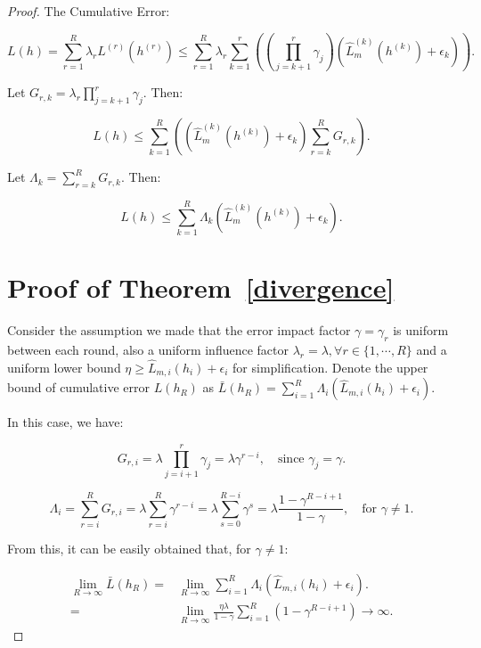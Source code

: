 \begin{proof}
The Cumulative Error:

\[
L(h) = \sum_{r=1}^R \lambda_r L^{(r)}(h^{(r)}) \leq \sum_{r=1}^R \lambda_r \sum_{k=1}^{r} \left( \left( \prod_{j=k+1}^{r} \gamma_j \right) \left( \hat{L}_m^{(k)}(h^{(k)}) + \epsilon_k \right) \right).
\]

Let \( G_{r,k} = \lambda_r \prod_{j=k+1}^{r} \gamma_j \). Then:

\[
L(h) \leq \sum_{k=1}^R \left( \left( \hat{L}_m^{(k)}(h^{(k)}) + \epsilon_k \right) \sum_{r=k}^R G_{r,k} \right).
\]

Let \( \Lambda_k = \sum_{r=k}^R G_{r,k} \). Then:

\[
L(h) \leq \sum_{k=1}^R \Lambda_k \left( \hat{L}_m^{(k)}(h^{(k)}) + \epsilon_k \right).
\]

\section{Proof of Theorem~\ref{divergence}}\label{appendix:divergence}

Consider the assumption we made that the error impact factor \(\gamma = \gamma_r\) is uniform between each round, also a uniform influence factor \(\lambda_r = \lambda, \forall r \in \{1,\cdots, R\}\) and a uniform lower bound \(\eta \geq  \hat{L}_{m,i}(h_{i}) + \epsilon_i \) for simplification. Denote the upper bound of cumulative error \(L(h_R)\) as \( \bar L(h_R) = \sum_{i=1}^R \Lambda_i \left( \hat{L}_{m,i}(h_{i}) + \epsilon_i \right)\).

In this case, we have:

\[
G_{r,i} = \lambda \prod_{j=i+1}^{r} \gamma_j = \lambda \gamma^{r - i}, \quad \text{since } \gamma_j = \gamma.
\]

\[
\Lambda_i = \sum_{r=i}^R G_{r,i} = \lambda \sum_{r=i}^R \gamma^{r - i} = \lambda \sum_{s=0}^{R - i} \gamma^{s} = \lambda \frac{1 - \gamma^{R - i + 1}}{1 - \gamma}, \quad \text{for } \gamma \neq 1.
\]

From this, it can be easily obtained that, for \(\gamma \neq 1\): 

\[
\begin{aligned}
    \lim_{R \to \infty} \bar L(h_R) =&\lim_{R \to \infty} \sum_{i=1}^R \Lambda_i \left( \hat{L}_{m,i}(h_{i}) + \epsilon_i \right).\\
    =&\lim_{R \to \infty} \frac{\eta \lambda}{1 - \gamma} \sum_{i=1}^R \left( 1 - \gamma^{R - i + 1} \right) \to \infty.
\end{aligned}
\]
\end{proof}
